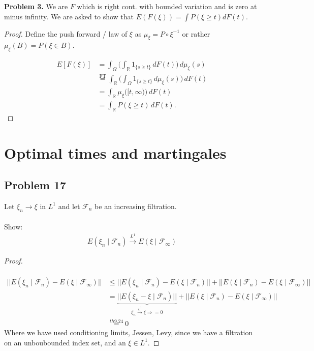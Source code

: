 \documentclass[11pt]{article}
\begin{document}
\textbf{Problem 3.}
\newline
We are $F$ which is right cont. with bounded variation and is zero at minus infinity. We are asked to show that $E(F(\xi)) = \int P(\xi \geq t) dF(t)$. 
\begin{proof}
Define the push forward / law of $\xi$ as $\mu_\xi = P \circ \xi^{-1}$ or rather $\mu_\xi(B) = P(\xi \in B)$.

\begin{align}
	E[F(\xi)] &= \int_\Omega \biggl(\int_{\mathbb{R}} 1_{\{s\ge t\}} \,dF(t)\biggr)\,d\mu_\xi(s) \\
	&\overset{\text{FT}}{=} \int_{\mathbb{R}} \biggl(\int_\Omega 1_{\{s\ge t\}} \,d\mu_\xi(s)\biggr)\,dF(t) \\
	&= \int_{\mathbb{R}} \mu_\xi\bigl([t,\infty)\bigr)\,dF(t) \\
	&= \int_{\mathbb{R}} P(\xi \ge t)\,dF(t).
\end{align}
\end{proof}

\newpage
\section*{Optimal times and martingales}
\subsection*{Problem 17}
Let $\xi_n \rightarrow \xi$ in $L^1$ and let $\mathcal{F}_n$ be an increasing filtration.\\ 
\\
Show: 
\begin{align*}
	E(\xi_n \mid \mathcal{F}_n) \overset{L^1}{\rightarrow} E(\xi \mid \mathcal{F}_\infty)
\end{align*}
\begin{proof}
	\\ \\
	\begin{align*}
		|| E(\xi_n \mid \mathcal{F}_n) - E(\xi \mid \mathcal{F}_\infty) || &\leq || E(\xi_n \mid \mathcal{F}_n) - E(\xi \mid \mathcal{F}_n)|| + || E(\xi \mid \mathcal{F}_n)- E(\xi \mid \mathcal{F}_\infty) || \\ 
		&= \underbrace{|| E(\xi_n - \xi \mid \mathcal{F}_n) ||}_{\xi_n \overset{L^1}{\rightarrow} \xi \Rightarrow =0 } + || E(\xi \mid \mathcal{F}_n ) - E(\xi \mid \mathcal{F}_\infty)||\\
		&\overset{th 9.24}{=}  0
	\end{align*}
Where we have used conditioning limits, Jessen, Levy, since we have a filtration on an unboubounded index set, and an $\xi\in L^1$.
\end{proof}
\end{document}
